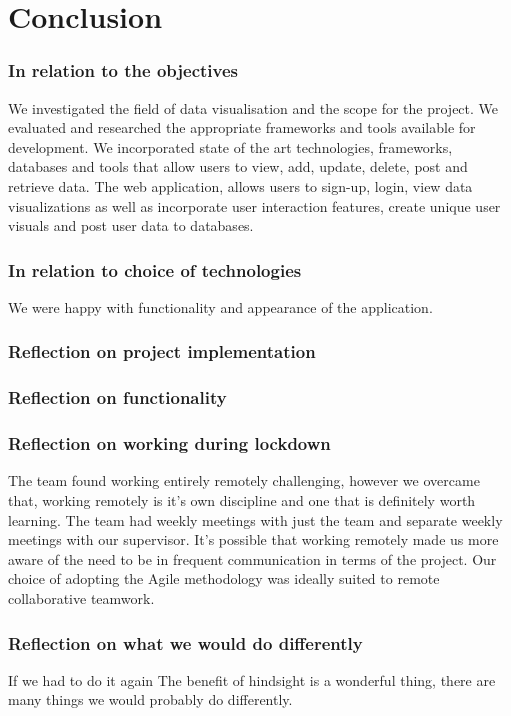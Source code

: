 \chapter{Conclusion}
\subsection{In relation to the objectives}
We investigated the field of data visualisation and the scope for the project.
We evaluated and researched the appropriate frameworks and tools available for development.
We incorporated state of the art technologies, frameworks, databases and tools that allow users to view, add, update, delete, post and retrieve data.
The web application, allows users to sign-up, login, view data visualizations as well as incorporate user interaction features, create unique user visuals and post user data to databases.

\subsection{In relation to choice of technologies}
We were happy with functionality and appearance of the application. 

\subsection{Reflection on project implementation}


\subsection{Reflection on functionality}


\subsection{Reflection on working during lockdown}
The team found working entirely remotely challenging, however we overcame that, working remotely is it's own discipline and one that is definitely worth learning. The team had weekly meetings with just the team and separate weekly meetings with our supervisor. It's possible that working remotely made us more aware of the need to be in frequent communication in terms of the project. Our choice of adopting the Agile methodology was ideally suited to remote collaborative teamwork.

\subsection{Reflection on what we would do differently}
If we had to do it again
The benefit of hindsight is a wonderful thing, there are many things we would probably do differently.

